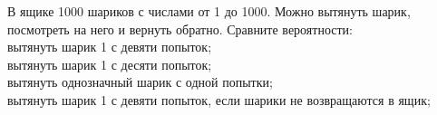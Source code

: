 
\problem
В ящике 1000 шариков с числами от 1 до 1000.
Можно вытянуть шарик, посмотреть на него и вернуть обратно.
Сравните вероятности:
\\
\sbp
вытянуть шарик 1 с девяти попыток;
\\
\sbpx{*}
вытянуть шарик 1 с десяти попыток;
\\
\sbp
вытянуть однозначный шарик с одной попытки;
\\
\sbp
вытянуть шарик 1 с девяти попыток, если шарики не возвращаются в ящик;

